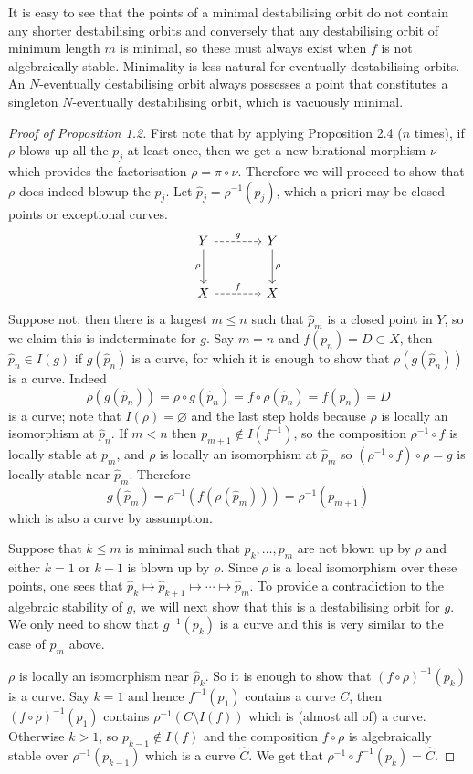 \documentclass[11pt]{article}
\begin{document}
It is easy to see that the points of a minimal destabilising orbit do not
contain any shorter destabilising orbits and conversely that any
destabilising orbit of minimum length $m$ is minimal, so these must always
exist when $f$ is not algebraically stable. Minimality is less natural for
eventually destabilising orbits. An $N$-eventually destabilising orbit always
possesses a point that constitutes a singleton $N$-eventually destabilising
orbit, which is vacuously minimal.

\begin{proof}[Proof of Proposition 1.2]
First note that by applying Proposition 2.4 ($n$ times), if $\rho$ blows up
all the $p_j$ at least once, then we get a new birational morphism $\nu$
which provides the factorisation $\rho=\pi\circ\nu$. Therefore we will
proceed to show that $\rho$ does indeed blowup the $p_j$. Let
$\widehat p_j=\rho^{-1}(p_j)$, which a priori may be closed points or
exceptional curves.
\[
\begin{tikzcd}[row sep=large,column sep=large]
Y \arrow[r,dashed,"g"] \arrow[d,"\rho"'] & Y \arrow[d,"\rho"] \\
X \arrow[r,dashed,"f"] & X
\end{tikzcd}
\]
Suppose not; then there is a largest $m\leq n$ such that $\widehat p_m$
is a closed point in $Y$, so we claim this is indeterminate for $g$. Say
$m=n$ and $f(p_n)=D\subset X$, then $\widehat p_n\in I(g)$ if
$g(\widehat p_n)$ is a curve, for which it is enough to show that
$\rho(g(\widehat p_n))$ is a curve. Indeed
\[
\rho(g(\widehat p_n))=\rho\circ g(\widehat p_n)
=f\circ\rho(\widehat p_n)=f(p_n)=D
\]
is a curve; note that $I(\rho)=\varnothing$ and the last step holds because
$\rho$ is locally an isomorphism at $\widehat p_n$. If $m<n$ then
$p_{m+1}\notin I(f^{-1})$, so the composition $\rho^{-1}\circ f$ is locally
stable at $p_m$, and $\rho$ is locally an isomorphism at $\widehat p_m$
so $(\rho^{-1}\circ f)\circ\rho=g$ is locally stable near
$\widehat p_m$. Therefore
\[
g(\widehat p_m)=\rho^{-1}(f(\rho(\widehat p_m)))=\rho^{-1}(p_{m+1})
\]
which is also a curve by assumption.

Suppose that $k\leq m$ is minimal such that $p_k,\ldots,p_m$ are not
blown up by $\rho$ and either $k=1$ or $k-1$ is blown up by $\rho$. Since
$\rho$ is a local isomorphism over these points, one sees that
$\widehat p_k\mapsto\widehat p_{k+1}\mapsto\cdots\mapsto\widehat p_m$.
To provide a contradiction to the algebraic stability of $g$, we will next
show that this is a destabilising orbit for $g$. We only need to show
that $g^{-1}(p_k)$ is a curve and this is very similar to the case of $p_m$
above.

$\rho$ is locally an isomorphism near $\widehat p_k$. So it is enough to
show that $(f\circ\rho)^{-1}(p_k)$ is a curve. Say $k=1$ and hence
$f^{-1}(p_1)$ contains a curve $C$, then $(f\circ\rho)^{-1}(p_1)$ contains
$\rho^{-1}(C\setminus I(f))$ which is (almost all of) a curve. Otherwise
$k>1$, so $p_{k-1}\notin I(f)$ and the composition $f\circ\rho$ is
algebraically stable over $\rho^{-1}(p_{k-1})$ which is a curve
$\widehat C$. We get that $\rho^{-1}\circ f^{-1}(p_k)=\widehat C$.
\end{proof}
\end{document}
